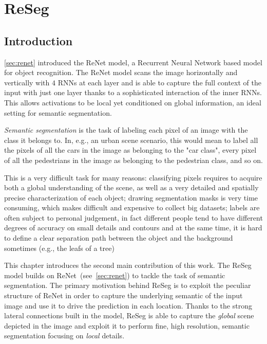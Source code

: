 \chapter{ReSeg}\label{sec:reseg}

\section{Introduction}\label{sec:reseg_intro}
\autoref{sec:renet} introduced the ReNet model, a Recurrent Neural Network
based model for object recognition. The ReNet model scans the image
horizontally and vertically with $4$ RNNs at each layer and is able to capture
the full context of the input with just one layer thanks to a sophisticated
interaction of the inner RNNs. This allows activations to be local yet
conditioned on global information, an ideal setting for semantic segmentation.

\emph{Semantic segmentation} is the task of labeling each pixel of an image
with the class it belongs to. In, e.g., an urban scene scenario, this would
mean to label all the pixels of all the cars in the image as belonging to the
"car class", every pixel of all the pedestrians in the image as belonging to
the pedestrian class, and so on.

This is a very difficult task for many reasons: classifying pixels requires to
acquire both a global understanding of the scene, as well as a very detailed
and spatially precise characterization of each object; drawing segmentation
masks is very time consuming, which makes difficult and expensive to collect
big datasets; labels are often subject to personal judgement, in fact different
people tend to have different degrees of accuracy on small details and
contours and at the same time, it is hard to define a clear separation path
between the object and the background sometimes (e.g., the leafs of a tree)


This chapter introduces the second main contribution of this work. The ReSeg
model builds on ReNet~(see~\autoref{sec:renet}) to tackle the task of semantic
segmentation. The primary motivation behind ReSeg is to exploit the peculiar
structure of ReNet in order to capture the underlying semantic of the input
image and use it to drive the prediction in each location. Thanks to the strong
lateral connections built in the model, ReSeg is able to capture the
\emph{global} scene depicted in the image and exploit it to perform fine,
high resolution, semantic segmentation focusing on \emph{local} details.

